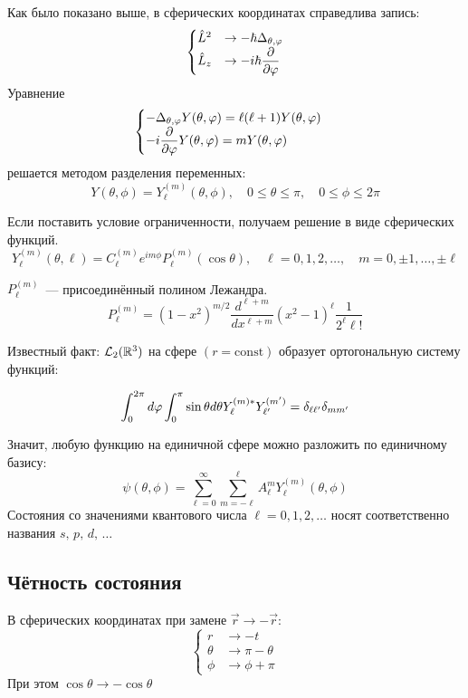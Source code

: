 Как было показано выше, в сферических координатах справедлива запись:
$$
    \begin{cases}
        \Hat L^2 &\to -\hbar \Delta_{\theta, \varphi}\\
        \Hat L_z &\to -i \hbar \dfrac{\partial }{\partial \varphi}
    \end{cases}
$$
Уравнение
$$
    \begin{cases}
        -\Delta_{\theta, \varphi} Y(\theta, \varphi) = \ell (\ell + 1) Y(\theta, \varphi)\\
        -i \dfrac{\partial }{\partial \varphi} Y(\theta, \varphi) = m Y(\theta, \varphi)
    \end{cases}
$$
 решается методом разделения переменных:
$$
    Y(\theta, \phi) = Y_\ell^{(m)} (\theta, \phi), \quad 0 \leqslant \theta \leqslant \pi, \quad 0 \leqslant \phi \leqslant 2\pi
$$

Если поставить условие ограниченности, получаем решение в виде сферических функций.
$$
    Y_\ell^{(m)} (\theta, \ell) = C_\ell^{(m)} e^{i m\phi} P_\ell^{(m)} (\cos \theta), \quad \ell = 0, 1, 2, \ldots, \quad m = 0, \pm 1, \ldots, \pm \ell
$$

$P_\ell^{(m)}$~--- присоединённый полином Лежандра.
$$
    P_\ell^{(m)} = (1-x^2)^{m/2} \dfrac{d^{\ell + m}}{dx^{\ell + m}} (x^2 - 1)^{\ell} \dfrac{1}{2^\ell \ell!}
$$

Известный факт: $\mathcal{L}_2(\mathbb {R}^3)$ на сфере $(r = \mathrm{const})$ образует ортогональную систему функций:
\begingroup

$$
    \int_0^{2\pi} d\varphi \int_0^\pi \sin \theta d \theta
    Y_\ell ^{(m)\ast} Y_{\ell'}^{(m')}= \delta_{\ell \ell'}\delta_{mm'}
$$

Значит, любую функцию на единичной сфере можно разложить по единичному базису:
$$
    \psi(\theta, \phi) = \sum_{\ell = 0}^\infty \sum_{m = -\ell}^{\ell} A_\ell ^{m} Y_{\ell }^{(m)} (\theta, \phi)
$$
\Reminder Состояния со значениями квантового числа $\ell = 0, 1, 2, \ldots$ носят соответственно названия $s, \, p, \, d, \, \ldots$


\subsection{Чётность состояния}
В сферических координатах при замене $\vec r \to -\vec r $:
$$
    \begin{cases}
        r & \to -t\\
        \theta &\to \pi - \theta\\
        \phi &\to \phi + \pi
    \end{cases}
$$
При этом $\cos \theta \to - \cos \theta$

